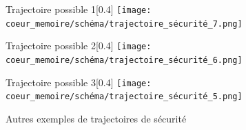 \begin{figure}[H]
  \centering
  \begin{subcaptionbox}{Trajectoire possible 1}[0.4\linewidth]
    {\texttt{[image: coeur\_memoire/schéma/trajectoire\_sécurité\_7.png]}}
  \end{subcaptionbox}
  \hfill
  \begin{subcaptionbox}{Trajectoire possible 2}[0.4\linewidth]
    {\texttt{[image: coeur\_memoire/schéma/trajectoire\_sécurité\_6.png]}}
  \end{subcaptionbox}
  
  \vspace{0.5cm}
  
  \begin{subcaptionbox}{Trajectoire possible 3}[0.4\linewidth]
    {\texttt{[image: coeur\_memoire/schéma/trajectoire\_sécurité\_5.png]}}

  \end{subcaptionbox}

  \caption{Autres exemples de trajectoires de sécurité}
\end{figure}

